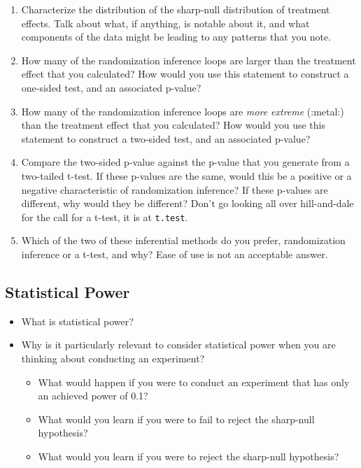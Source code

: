 \documentclass[
]{article}
\providecommand{\tightlist}{%
  \setlength{\itemsep}{0pt}\setlength{\parskip}{0pt}}
\theoremstyle{definition}
\theoremstyle{definition}
\theoremstyle{definition}
\theoremstyle{definition}
\theoremstyle{remark}
\begin{document}
\begin{enumerate}
\def\labelenumi{\arabic{enumi}.}
\item
  Characterize the distribution of the sharp-null distribution of treatment effects. Talk about what, if anything, is notable about it, and what components of the data might be leading to any patterns that you note.
\item
  How many of the randomization inference loops are larger than the treatment effect that you calculated? How would you use this statement to construct a one-sided test, and an associated p-value?
\item
  How many of the randomization inference loops are \emph{more extreme} (:metal:) than the treatment effect that you calculated? How would you use this statement to construct a two-sided test, and an associated p-value?
\item
  Compare the two-sided p-value against the p-value that you generate from a two-tailed t-test. If these p-values are the same, would this be a positive or a negative characteristic of randomization inference? If these p-values are different, why would they be different? Don't go looking all over hill-and-dale for the call for a t-test, it is at \texttt{t.test}.
\item
  Which of the two of these inferential methods do you prefer, randomization inference or a t-test, and why? Ease of use is not an acceptable answer.
\end{enumerate}

\subsection{Statistical Power}\label{statistical-power}

\begin{itemize}
\tightlist
\item
  What is statistical power?
\item
  Why is it particularly relevant to consider statistical power when you are thinking about conducting an experiment?

  \begin{itemize}
  \tightlist
  \item
    What would happen if you were to conduct an experiment that has only an achieved power of 0.1?
  \item
    What would you learn if you were to fail to reject the sharp-null hypothesis?
  \item
    What would you learn if you were to reject the sharp-null hypothesis?
  \end{itemize}
\end{itemize}
\end{document}
